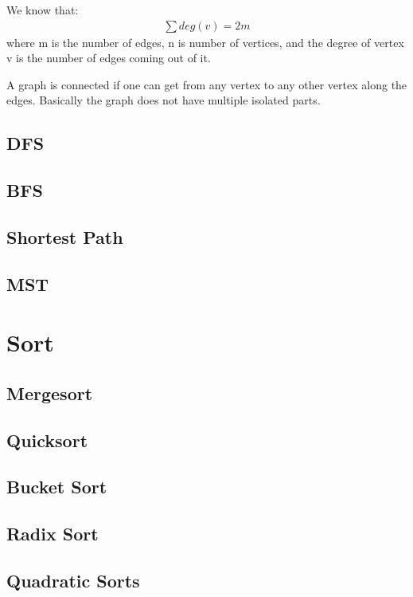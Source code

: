 \documentclass[12pt,letterpaper]{article} \usepackage{amsmath} \usepackage{graphicx} \usepackage[margin=1in]{geometry} \usepackage{longtable}  \usepackage{amssymb}
\begin{document}
	We know that:
	\begin{align*}
		\sum deg(v) = 2m
	\end{align*}
	where m is the number of edges, n is number of vertices, and the degree of vertex v is the number of edges coming out of it. 
	
	A graph is connected if one can get from any vertex to any other vertex along the edges. Basically the graph does not have multiple isolated parts. 
	
	\subsection{DFS}
	
	\subsection{BFS}
	
	\subsection{Shortest Path}
	
	\subsection{MST}
	
	\section{Sort}
	
	\subsection{Mergesort}
	
	\subsection{Quicksort}
	
	\subsection{Bucket Sort}
	
	\subsection{Radix Sort}
	
	\subsection{Quadratic Sorts}
	
	
	
	
	
	
	
\end{document}
